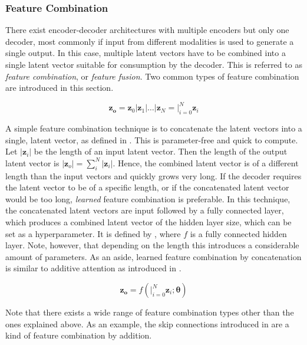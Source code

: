 \subsubsection{Feature Combination}
There exist encoder-decoder architectures with multiple encoders but only one decoder, most commonly if input from different modalities is used to generate a single output. In this case, multiple latent vectors have to be combined into a single latent vector suitable for consumption by the decoder. This is referred to as \emph{feature combination}, or \emph{feature fusion}. Two common types of feature combination are introduced in this section.

\begin{equation}
    \label{eq:concatfeaturefusion}
    \mathbf{z_o}= \mathbf{z}_0 | \mathbf{z}_1 | \dots | \mathbf{z}_N= |_{i=0}^N \mathbf{z}_i
\end{equation}

A simple feature combination technique is to concatenate the latent vectors into a single, latent vector, as defined in . This is parameter-free and quick to compute. Let $|\mathbf{z}_i|$ be the length of an input latent vector. Then the length of the output latent vector is $|\mathbf{z}_o| =\sum_i^N |\mathbf{z}_i|$. Hence, the combined latent vector is of a different length than the input vectors and quickly grows very long. If the decoder requires the latent vector to be of a specific length, or if the concatenated latent vector would be too long, \emph{learned} feature combination is preferable. In this technique, the concatenated latent vectors are input followed by a fully connected layer, which produces a combined latent vector of the hidden layer size, which can be set as a hyperparameter. It is defined by , where $f$ is a fully connected hidden layer. Note, however, that depending on the length this introduces a considerable amount of parameters. As an aside, learned feature combination by concatenation is similar to additive attention as introduced in .

\begin{equation}
    \label{eq:learnedfeaturefusion}
    \mathbf{z_o}=f(|_{i=0}^N \mathbf{z}_i;\boldsymbol{\theta})
\end{equation}

Note that there exists a wide range of feature combination types other than the ones explained above. As an example, the skip connections introduced in  are a kind of feature combination by addition.

